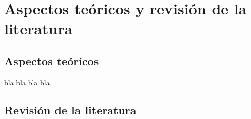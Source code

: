 \chapter{Aspectos teóricos y revisión de la literatura}
\section{Aspectos teóricos}
bla bla bla bla
\section{Revisión de la literatura}

